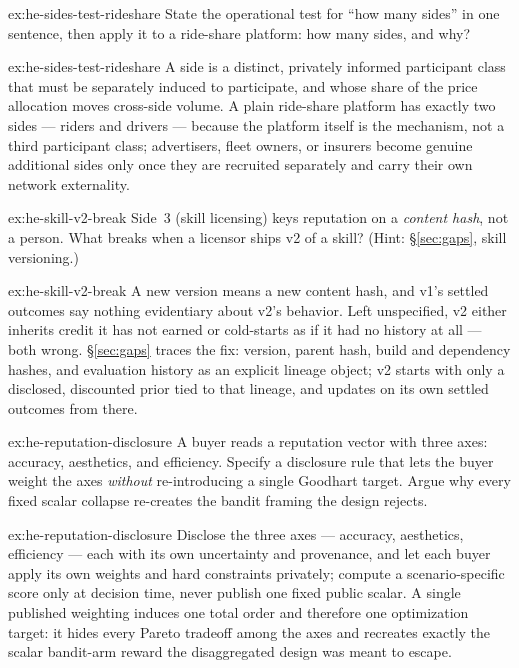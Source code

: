 \documentclass[11pt,a4paper]{article}
\theoremstyle{definition}
\theoremstyle{definition}
\theoremstyle{remark}
\begin{document}
\begin{pdexercise}[kind=Check,rating=1]{ex:he-sides-test-rideshare}
State the operational test for ``how many sides'' in one sentence, then apply
  it to a ride-share platform: how many sides, and why?
\end{pdexercise}
\begin{pdsolution}{ex:he-sides-test-rideshare}
A side is a distinct, privately informed participant class that must be
separately induced to participate, and whose share of the price allocation moves
cross-side volume. A plain ride-share platform has exactly two sides --- riders
and drivers --- because the platform itself is the mechanism, not a third
participant class; advertisers, fleet owners, or insurers become genuine
additional sides only once they are recruited separately and carry their own
network externality.
\end{pdsolution}
\begin{pdexercise}[kind=Trace,rating=2]{ex:he-skill-v2-break}
Side~3 (skill licensing) keys reputation on a \emph{content hash}, not a
  person. What breaks when a licensor ships v2 of a skill? (Hint:
  \S\ref{sec:gaps}, skill versioning.)
\end{pdexercise}
\begin{pdsolution}{ex:he-skill-v2-break}
A new version means a new content hash, and v1's settled outcomes say
nothing evidentiary about v2's behavior. Left unspecified, v2 either inherits
credit it has not earned or cold-starts as if it had no history at all --- both
wrong. \S\ref{sec:gaps} traces the fix: version, parent hash, build and
dependency hashes, and evaluation history as an explicit lineage object; v2
starts with only a disclosed, discounted prior tied to that lineage, and updates
on its own settled outcomes from there.
\end{pdsolution}
\begin{pdexercise}[kind=Open,rating=3]{ex:he-reputation-disclosure}
A buyer reads a reputation vector with three axes: accuracy, aesthetics, and
  efficiency. Specify a disclosure rule that lets the buyer weight the axes \emph{without} re-introducing a single
  Goodhart target. Argue why every fixed scalar collapse re-creates the bandit
  framing the design rejects.
\end{pdexercise}
\begin{pdsolution}{ex:he-reputation-disclosure}
Disclose the three axes --- accuracy, aesthetics, efficiency --- each with
its own uncertainty and provenance, and let each buyer apply its own weights and
hard constraints privately; compute a scenario-specific score only at decision
time, never publish one fixed public scalar. A single published weighting induces
one total order and therefore one optimization target: it hides every Pareto
tradeoff among the axes and recreates exactly the scalar bandit-arm reward the
disaggregated design was meant to escape.
\end{pdsolution}
\end{document}
